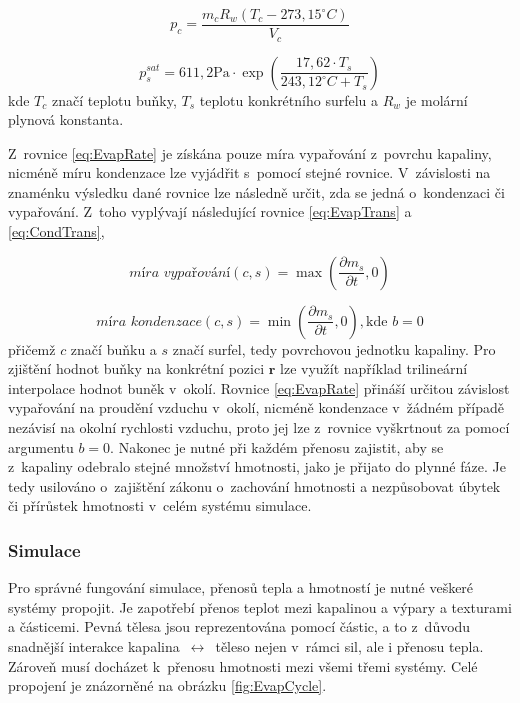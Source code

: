\begin{equation}
	p_c = \frac{m_c R_w(T_c - 273,15^{\circ}C)}{V_c}
	\label{eq:evapPress}
\end{equation}

\begin{equation}
	p_s^{sat} = 611,2 \text{Pa} \cdot \exp\left({\frac{17,62 \cdot T_s}{243,12^{\circ}C + T_s}}\right)
	\label{eq:evapSatur}
\end{equation}
kde $T_c$ značí teplotu buňky, $T_s$ teplotu konkrétního surfelu a $R_w$ je molární plynová konstanta.


Z~rovnice \ref{eq:EvapRate} je získána pouze míra vypařování z~povrchu kapaliny, nicméně míru kondenzace lze vyjádřit s~pomocí stejné rovnice. V~závislosti na znaménku výsledku dané rovnice lze následně určit, zda se jedná o~kondenzaci či vypařování. Z~toho vyplývají následující rovnice \ref{eq:EvapTrans} a \ref{eq:CondTrans},

\begin{equation}
	\textit{míra vypařování}(c,s) = \max\left(\frac{\partial m_s}{\partial t}, 0\right)
	\label{eq:EvapTrans}
\end{equation}

\begin{equation}
	\textit{míra kondenzace}(c,s) = \min\left(\frac{\partial m_s}{\partial t}, 0\right), \text{kde } b = 0
	\label{eq:CondTrans}
\end{equation}
přičemž $c$ značí buňku a $s$ značí surfel, tedy povrchovou jednotku kapaliny. Pro zjištění hodnot buňky na konkrétní pozici $\mathbf{r}$ lze využít například trilineární interpolace hodnot buněk v~okolí. Rovnice \ref{eq:EvapRate} přináší určitou závislost vypařování na proudění vzduchu v~okolí, nicméně kondenzace v~žádném případě nezávisí na okolní rychlosti vzduchu, proto jej lze z~rovnice vyškrtnout za pomocí argumentu $b=0$. Nakonec je nutné při každém přenosu zajistit, aby se z~kapaliny odebralo stejné množství hmotnosti, jako je přijato do plynné fáze. Je tedy usilováno o~zajištění zákonu o~zachování hmotnosti a nezpůsobovat úbytek či přírůstek hmotnosti v~celém systému simulace.

\subsubsection{Simulace}
Pro správné fungování simulace, přenosů tepla a hmotností je nutné veškeré systémy propojit. Je zapotřebí přenos teplot mezi kapalinou a výpary a texturami a částicemi. Pevná tělesa jsou reprezentována pomocí částic, a to z~důvodu snadnější interakce kapalina~$\leftrightarrow$~\mbox{těleso} nejen v~rámci sil, ale i přenosu tepla. Zároveň musí docházet k~přenosu hmotnosti mezi všemi třemi systémy. Celé propojení je znázorněné na obrázku \ref{fig:EvapCycle}.

